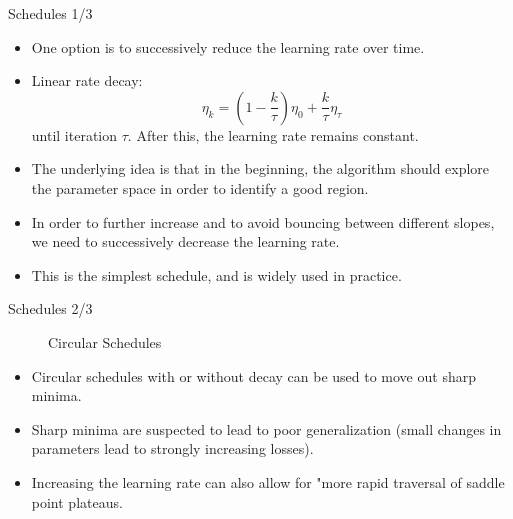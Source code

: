 \documentclass[handout,xcolor=pdftex,dvipsnames,table,mathserif]{beamer}
\begin{document}
\begin{frame}{Schedules 1/3}
\begin{itemize}
\item One option is to successively reduce the learning rate over time.
\item Linear rate decay:
\begin{equation*}
	\eta_k = (1-\frac{k}{\tau})\eta_0 + \frac{k}{\tau} \eta_{\tau}
\end{equation*}
until iteration $\tau$. After this, the learning rate remains constant. 
\item The underlying idea is that in the beginning, the algorithm should explore the parameter space in order to identify a good region.
\item In order to further increase and to avoid bouncing between different slopes, we need to successively decrease the learning rate. 
\item This is the simplest schedule, and is widely used in practice. 
\end{itemize}
\end{frame}

\begin{frame}{Schedules 2/3}
\begin{figure}[htb]
  \centering
  \hspace{.3cm}
  \caption{Circular Schedules \cite{smith2017cyclical}}
\end{figure}
\begin{itemize}
	\item Circular schedules with or without decay can be used to move out sharp minima. 
	\item Sharp minima are suspected to lead to poor generalization (small changes in parameters lead to strongly increasing losses). 
	\item Increasing the learning rate can also allow for "more rapid traversal of saddle point plateaus.
\end{itemize}
\end{frame}
\end{document}

